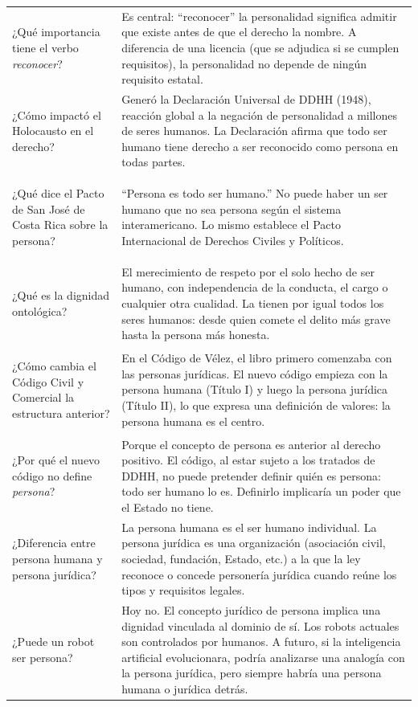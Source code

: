 \documentclass[12pt,oneside]{book}
\begin{document}
\begin{longtable}{
    >{\bfseries\raggedright\arraybackslash}p{}
    >{\raggedright\arraybackslash}p{}
}
¿Qué importancia tiene el verbo \emph{reconocer}? &
Es central: ``reconocer'' la personalidad significa admitir que existe antes de que el derecho la nombre. A diferencia de una licencia (que se adjudica si se cumplen requisitos), la personalidad no depende de ningún requisito estatal. \\

¿Cómo impactó el Holocausto en el derecho? &
Generó la Declaración Universal de DDHH (1948), reacción global a la negación de personalidad a millones de seres humanos. La Declaración afirma que todo ser humano tiene derecho a ser reconocido como persona en todas partes. \\

¿Qué dice el Pacto de San José de Costa Rica sobre la persona? &
``Persona es todo ser humano.'' No puede haber un ser humano que no sea persona según el sistema interamericano. Lo mismo establece el Pacto Internacional de Derechos Civiles y Políticos. \\

¿Qué es la dignidad ontológica? &
El merecimiento de respeto por el solo hecho de ser humano, con independencia de la conducta, el cargo o cualquier otra cualidad. La tienen por igual todos los seres humanos: desde quien comete el delito más grave hasta la persona más honesta. \\

¿Cómo cambia el Código Civil y Comercial la estructura anterior? &
En el Código de Vélez, el libro primero comenzaba con las personas jurídicas. El nuevo código empieza con la persona humana (Título I) y luego la persona jurídica (Título II), lo que expresa una definición de valores: la persona humana es el centro. \\

¿Por qué el nuevo código no define \emph{persona}? &
Porque el concepto de persona es anterior al derecho positivo. El código, al estar sujeto a los tratados de DDHH, no puede pretender definir quién es persona: todo ser humano lo es. Definirlo implicaría un poder que el Estado no tiene. \\

¿Diferencia entre persona humana y persona jurídica? &
La persona humana es el ser humano individual. La persona jurídica es una organización (asociación civil, sociedad, fundación, Estado, etc.) a la que la ley reconoce o concede personería jurídica cuando reúne los tipos y requisitos legales. \\

¿Puede un robot ser persona? &
Hoy no. El concepto jurídico de persona implica una dignidad vinculada al dominio de sí. Los robots actuales son controlados por humanos. A futuro, si la inteligencia artificial evolucionara, podría analizarse una analogía con la persona jurídica, pero siempre habría una persona humana o jurídica detrás. \\


\end{longtable}
\end{document}
